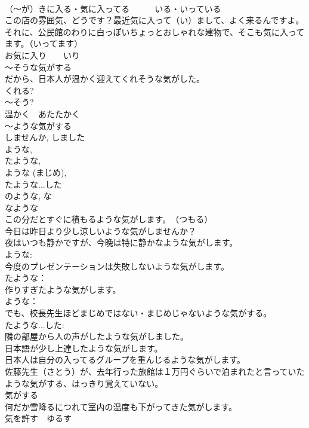 \documentclass[8pt]{extreport}
\begin{document}
\begin{CJK}{UTF8}{min}
\\	（～が）きに入る・気に入ってる　　　いる・いっている
\\	この店の雰囲気、どうです？最近気に入って（い）まして、よく来るんですよ。
\\	それに、公民館のわりに白っぽいちょっとおしゃれな建物で、そこも気に入ってます。（いってます）
\\	お気に入り　　いり
\\	～そうな気がする
\\	だから、日本人が温かく迎えてくれそうな気がした。
\\	くれる?　
\\	～そう?
\\	温かく　あたたかく
\\	～ような気がする
\\	しませんか, しました
\\	ような, 
\\	たような, 
\\	ような (まじめ), 
\\	たような...した
\\	のような, な
\\	なような
\\	この分だとすぐに積もるような気がします。　（つもる）
\\	今日は昨日より少し涼しいような気がしませんか？
\\	夜はいつも静かですが、今晩は特に静かなような気がします。
\\	ような:
\\	今度のプレゼンテーションは失敗しないような気がします。
\\	たような：
\\	作りすぎたような気がします。
\\	ような：
\\	でも、校長先生ほどまじめではない・まじめじゃないような気がする。
\\	たような...した:
\\	隣の部屋から人の声がしたような気がしました。
\\	日本語が少し上達したような気がします。
\\	日本人は自分の入ってるグループを重んじるような気がします。
\\	佐藤先生（さとう）が、去年行った旅館は１万円ぐらいで泊まれたと言っていたような気がする、はっきり覚えていない。
\\	気がする
\\	何だか雪降るにつれて室内の温度も下がってきた気がします。
\\	気を許す　ゆるす

\end{CJK}
\end{document}
